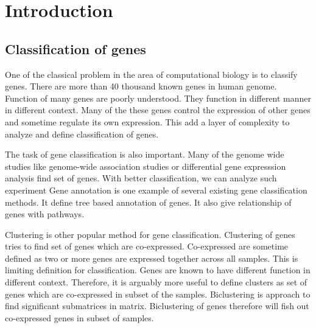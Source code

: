 \documentclass{article}
\begin{document}


\section{Introduction}
\subsection{Classification of genes}
One of the classical problem in the area of computational biology is to classify genes. 
There are more than 40 thousand known genes in human genome.
Function of many genes are 
poorly understood. 
They function in different manner in different context.  Many 
of the these genes control the expression of other genes and sometime regulate its own 
expression. This add a layer of complexity to analyze and define classification
of genes.


The task of gene classification is also important. Many of the genome wide studies like
genome-wide association studies or differential gene expresssion analysis find set
of genes. With better classification, we can analyze such experiment
Gene annotation is one example of several existing gene classification methods. It define 
tree based annotation of genes. It also give relationship of genes with pathways. 

Clustering is other popular method for gene classification. Clustering of genes tries
to find set of genes which are co-expressed. Co-expressed are sometime defined as two or more
genes
are expressed together across all samples. This is limiting definition for classification.
Genes are known to have different function in different context. Therefore, it is arguably
more useful to define clusters as 
set of genes which are co-expressed in subset of the samples.
Biclustering is approach to find significant submatrices in matrix. Biclustering of genes
therefore will fish out co-expressed genes in subset of samples.
\end{document}
